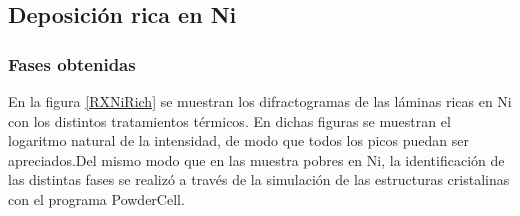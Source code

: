 \documentclass[12pt]{article}
\theoremstyle{definition}
\theoremstyle{remark}
\begin{document}
{\subsection{Deposición rica en Ni}
\subsubsection{Fases obtenidas}
En la figura \ref{RXNiRich} se muestran los difractogramas de las láminas ricas en Ni con los distintos tratamientos térmicos. En dichas figuras se muestran el logaritmo natural de la intensidad, de modo que todos los picos puedan ser apreciados.Del mismo modo que en las muestra pobres en Ni, la identificación de las distintas fases se realizó a través de la simulación de las estructuras cristalinas con el programa PowderCell.

\begin{figure}[H]
 \\

\end{figure}}
\end{document}
